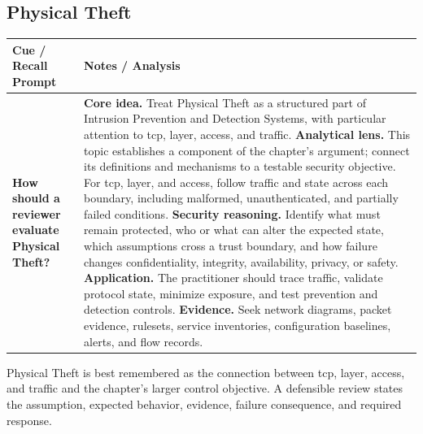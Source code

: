 \documentclass[11pt]{article}
\newcommand{\CornellHeader}{%
\rowcolor{Navy}\color{white}\bfseries Cue / Recall Prompt & \color{white}\bfseries Notes / Analysis\\\hline}
\newcommand{\CornellRow}[2]{%
\cellcolor{CueGray}\RaggedRight\textbf{#1} & \RaggedRight #2\\\hline}
\begin{document}
\subsection*{Physical Theft}
\begin{longtable}{>{\RaggedRight\arraybackslash}p{}|>{\RaggedRight\arraybackslash}p{}}
\CornellHeader
\CornellRow{How should a reviewer evaluate Physical Theft?}{\textbf{Core idea.} Treat Physical Theft as a structured part of Intrusion Prevention and Detection Systems, with particular attention to tcp, layer, access, and traffic. \textbf{Analytical lens.} This topic establishes a component of the chapter's argument; connect its definitions and mechanisms to a testable security objective. For tcp, layer, and access, follow traffic and state across each boundary, including malformed, unauthenticated, and partially failed conditions. \textbf{Security reasoning.} Identify what must remain protected, who or what can alter the expected state, which assumptions cross a trust boundary, and how failure changes confidentiality, integrity, availability, privacy, or safety. \textbf{Application.} The practitioner should trace traffic, validate protocol state, minimize exposure, and test prevention and detection controls. \textbf{Evidence.} Seek network diagrams, packet evidence, rulesets, service inventories, configuration baselines, alerts, and flow records.}
\end{longtable}
\begin{topicsummary}
Physical Theft is best remembered as the connection between tcp, layer, access, and traffic and the chapter's larger control objective. A defensible review states the assumption, expected behavior, evidence, failure consequence, and required response.
\end{topicsummary}
\end{document}
